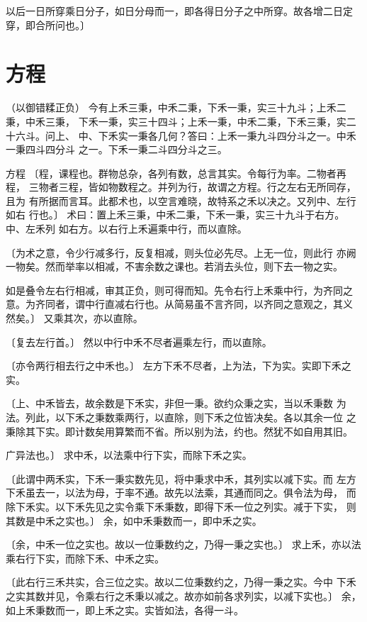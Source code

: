 \documentclass[a4paper,12pt,UTF8,twoside]{ctexbook}
\begin{document}
以后一日所穿乘日分子，如日分母而一，即各得日分子之中所穿。故各增二日定 穿，即合所问也。〕

\chapter{方程}
（以御错糅正负） 今有上禾三秉，中禾二秉，下禾一秉，实三十九斗；上禾二秉，中禾三秉， 下禾一秉，实三十四斗；上禾一秉，中禾二秉，下禾三秉，实二十六斗。问上、 中、下禾实一秉各几何？答曰：上禾一秉九斗四分斗之一。中禾一秉四斗四分斗 之一。下禾一秉二斗四分斗之三。

方程 〔程，课程也。群物总杂，各列有数，总言其实。令每行为率。二物者再程， 三物者三程，皆如物数程之。并列为行，故谓之方程。行之左右无所同存，且为 有所据而言耳。此都术也，以空言难晓，故特系之禾以决之。又列中、左行如右 行也。〕 术曰：置上禾三秉，中禾二秉，下禾一秉，实三十九斗于右方。中、左禾列 如右方。以右行上禾遍乘中行，而以直除。

〔为术之意，令少行减多行，反复相减，则头位必先尽。上无一位，则此行 亦阙一物矣。然而举率以相减，不害余数之课也。若消去头位，则下去一物之实。

如是叠令左右行相减，审其正负，则可得而知。先令右行上禾乘中行，为齐同之 意。为齐同者，谓中行直减右行也。从简易虽不言齐同，以齐同之意观之，其义 然矣。〕 又乘其次，亦以直除。

〔复去左行首。〕 然以中行中禾不尽者遍乘左行，而以直除。

〔亦令两行相去行之中禾也。〕 左方下禾不尽者，上为法，下为实。实即下禾之实。

〔上、中禾皆去，故余数是下禾实，非但一秉。欲约众秉之实，当以禾秉数 为法。列此，以下禾之秉数乘两行，以直除，则下禾之位皆决矣。各以其余一位 之秉除其下实。即计数矣用算繁而不省。所以别为法，约也。然犹不如自用其旧。

广异法也。〕 求中禾，以法乘中行下实，而除下禾之实。

〔此谓中两禾实，下禾一秉实数先见，将中秉求中禾，其列实以减下实。而 左方下禾虽去一，以法为母，于率不通。故先以法乘，其通而同之。俱令法为母， 而除下禾实。以下禾先见之实令乘下禾秉数，即得下禾一位之列实。减于下实， 则其数是中禾之实也。〕 余，如中禾秉数而一，即中禾之实。

〔余，中禾一位之实也。故以一位秉数约之，乃得一秉之实也。〕 求上禾，亦以法乘右行下实，而除下禾、中禾之实。

〔此右行三禾共实，合三位之实。故以二位秉数约之，乃得一秉之实。今中 下禾之实其数并见，令乘右行之禾秉以减之。故亦如前各求列实，以减下实也。〕 余，如上禾秉数而一，即上禾之实。实皆如法，各得一斗。
\end{document}
